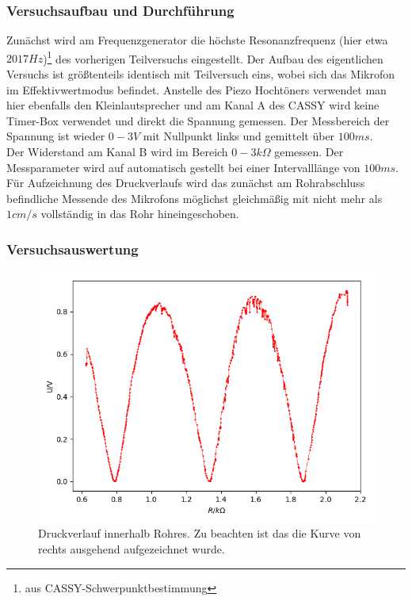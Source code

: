 \documentclass[12pt,a4paper]{article}
\begin{document}
\subsubsection{Versuchsaufbau und Durchführung}
Zunächst wird am Frequenzgenerator die höchste Resonanzfrequenz (hier etwa $2017Hz$)\footnote{aus CASSY-Schwerpunktbestimmung} des vorherigen Teilversuchs eingestellt.
Der Aufbau des eigentlichen Versuchs ist größtenteils identisch mit Teilversuch eins, wobei sich das Mikrofon im Effektivwertmodus befindet. Anstelle des Piezo Hochtöners verwendet man hier ebenfalls den Kleinlautsprecher und am Kanal A des CASSY wird keine Timer-Box verwendet und direkt die Spannung gemessen. Der Messbereich der Spannung ist wieder $0-3V$ mit Nullpunkt links und gemittelt über $100ms$.\\
Der Widerstand am Kanal B wird im Bereich $0-3k \Omega $ gemessen.
Der Messparameter wird auf automatisch gestellt bei einer Intervalllänge von $100ms$.\\
Für Aufzeichnung des Druckverlaufs wird das zunächst am Rohrabschluss  befindliche Messende des Mikrofons möglichst gleichmäßig mit nicht mehr als $1cm/s$ vollständig in das Rohr hineingeschoben.

\subsubsection{Versuchsauswertung}

\begin{figure}
	\includegraphics[width=\linewidth]{druckverlauf}
	\caption{Druckverlauf innerhalb Rohres. Zu beachten ist das die Kurve von rechts ausgehend aufgezeichnet wurde.}
	\label{Druckverlauf}
\end{figure}
\end{document}

